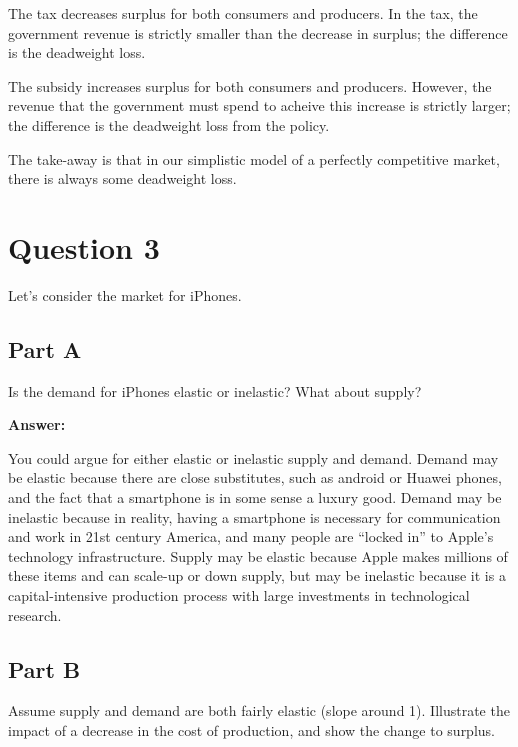 \documentclass[12pt]{article}
\begin{document}
The tax decreases surplus for both consumers and producers. In the tax, the government revenue is strictly smaller than the decrease in surplus; the difference is the deadweight loss. 

\vspace{2mm}

The subsidy increases surplus for both consumers and producers. However, the revenue that the government must spend to acheive this increase is strictly larger; the difference is the deadweight loss from the policy.

\vspace{2mm}

The take-away is that in our simplistic model of a perfectly competitive market, there is always some deadweight loss.

\section*{Question 3}
Let's consider the market for iPhones.

\subsection*{Part A}

Is the demand for iPhones elastic or inelastic? What about supply?

\vspace{2mm}

\textbf{Answer:}

\vspace{2mm}

You could argue for either elastic or inelastic supply and demand. Demand may be elastic because there are close substitutes, such as android or Huawei phones, and  the fact that a smartphone is in some sense a luxury good. Demand may be inelastic because in reality, having a smartphone is necessary for communication and work in 21st century America, and many people are ``locked in'' to Apple's technology infrastructure. Supply may be elastic because Apple makes millions of these items and can scale-up or down supply, but may be inelastic because it is a capital-intensive production process with large investments in technological research.

\subsection*{Part B}

Assume supply and demand are both fairly elastic (slope around 1). Illustrate the impact of a decrease in the cost of production, and show the change to surplus.
\end{document}
